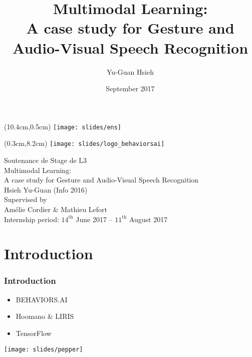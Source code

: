 \title[Multimodal Learning]
      {Multimodal Learning:\\
       A case study for Gesture and Audio-Visual Speech Recognition}
\author{Yu-Guan Hsieh}
\date{September 2017}


\begin{frame}
  \begin{textblock*}{2.2cm}(10.4cm,0.5cm) %
  \texttt{[image: slides/ens]}
  \end{textblock*}
  \begin{textblock*}{4cm}(0.3cm,8.2cm) %
  \texttt{[image: slides/logo\_behaviorsai]}
  \end{textblock*}
  \flushleft
  {\LARGE \color{BlueViolet} Soutenance de Stage de L3\\}
  \vspace{0.5em}
  {\Large \color{Blue} Multimodal Learning:\\}
  {\Large \color{Blue}
    A case study for Gesture and Audio-Visual Speech Recognition\\}
  \vspace{1.7em}
  \flushright
  {\large Hsieh Yu-Guan (Info 2016)\\}
  \vspace{0.7em}
  {\large Supervised by\\}
  {\large Amélie Cordier \& Mathieu Lefort\\}
  \vspace{0.7em}
  {\large Internship period:
    $14^{\mathrm{th}}$ June 2017 -- $11^{\mathrm{th}}$ August 2017\\}
\end{frame}

\section{Introduction}

\begin{frame}
  \frametitle{Introduction}
  \begin{itemize}
    \item BEHAVIORS.AI
    \item Hoomano \& LIRIS
    \item TensorFlow
  \end{itemize}
  \begin{center}
    \texttt{[image: slides/pepper]}
  \end{center}
\end{frame}

